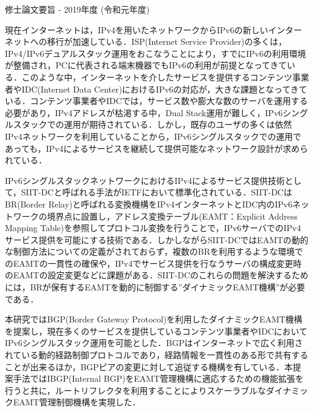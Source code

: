 修士論文要旨 - 2019年度 (令和元年度)
\begin{center}
\begin{large}
\end{large}
\end{center}

現在インターネットは，IPv4を用いたネットワークからIPv6の新しいインターネットへの移行が加速している．ISP(Internet Service Provider)の多くは，IPv4/IPv6デュアルスタック運用をおこなうことにより，すでにIPv6の利用環境が整備され，PCに代表される端末機器でもIPv6の利用が前提となってきている．このような中，インターネットを介したサービスを提供するコンテンツ事業者やIDC(Internet Data Center)におけるIPv6の対応が，大きな課題となってきている．コンテンツ事業者やIDCでは，サービス数や膨大な数のサーバを運用する必要があり，IPv4アドレスが枯渇する中，Dual Stack運用が難しく，IPv6シングルスタックでの運用が期待されている．しかし，既存のユーザの多くは依然IPv4ネットワークを利用していることから，IPv6シングルスタックでの運用であっても，IPv4によるサービスを継続して提供可能なネットワーク設計が求められている．

IPv6シングルスタックネットワークにおけるIPv4によるサービス提供技術として，SIIT-DCと呼ばれる手法がIETFにおいて標準化されている．SIIT-DCはBR(Border Relay)と呼ばれる変換機構をIPv4インターネットとIDC内のIPv6ネットワークの境界点に設置し，アドレス変換テーブル(EAMT：Explicit Address Mapping Table)を参照してプロトコル変換を行うことで，IPv6サーバでのIPv4サービス提供を可能にする技術である．しかしながらSIIT-DCではEAMTの動的な制御方法についての定義がされておらず，複数のBRを利用するような環境でのEAMTの一貫性の確保や，IPv4でサービス提供を行なうサーバの構成変更時のEAMTの設定変更などに課題がある．SIIT-DCのこれらの問題を解決するためには，BRが保有するEAMTを動的に制御する”ダイナミックEAMT機構”が必要である．

本研究ではBGP(Border Gateway Protocol)を利用したダイナミックEAMT機構を提案し，現在多くのサービスを提供しているコンテンツ事業者やIDCにおいてIPv6シングルスタック運用を可能とした．BGPはインターネットで広く利用されている動的経路制御プロトコルであり，経路情報を一貫性のある形で共有することが出来るほか，BGPピアの変更に対して追従する機構を有している．本提案手法ではIBGP(Internal BGP)をEAMT管理機構に適応するための機能拡張を行うと共に，ルートリフレクタを利用することによりスケーラブルなダイナミックEAMT管理制御機構を実現した．

